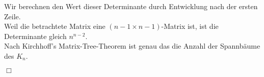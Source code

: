 Wir berechnen den Wert dieser Determinante durch Entwicklung nach der ersten Zeile. \\
Weil die betrachtete Matrix eine $(n-1 \times n-1)$-Matrix ist, ist die Determinante gleich $n^{n-2}$.\\
Nach Kirchhoff's Matrix-Tree-Theorem ist genau das die Anzahl der Spannbäume des $K_n$.
\begin{flushright} $\Box$ \end{flushright} 
